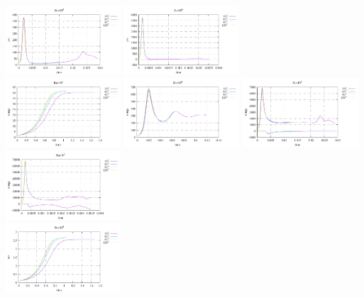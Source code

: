 \begin{center}
\includegraphics[width=4.297cm]{python_codes/fieldstone_155/results/stats_psi_Ra1e5}
\includegraphics[width=4.297cm]{python_codes/fieldstone_155/results/stats_psi_Ra1e6}\\
\includegraphics[width=4.297cm]{python_codes/fieldstone_155/results/stats_omega_Ra1e3}
\includegraphics[width=4.297cm]{python_codes/fieldstone_155/results/stats_omega_Ra1e4}
\includegraphics[width=4.297cm]{python_codes/fieldstone_155/results/stats_omega_Ra1e5}
\includegraphics[width=4.297cm]{python_codes/fieldstone_155/results/stats_omega_Ra1e6}
\\
\includegraphics[width=4.297cm]{python_codes/fieldstone_155/results/avrg_u_Ra1e3}

\end{center}
